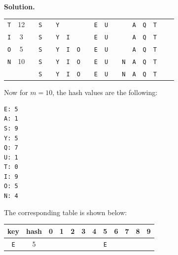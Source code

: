 \documentclass[12pt, a4paper]{article}
\newenvironment{sol}[1][Solution]
{\par\medskip\noindent \textbf{#1.} }
{\medskip}
\begin{document}
\begin{sol}
\begin{center}
\begin{tabular}{cc|cccccccccccccccc}
				\texttt{T} & 12 &
				{} & {\color{gray}\texttt{S}} & {} & {\color{gray}\texttt{Y}} & {} & {} & {} & {\color{gray}\texttt{E}} & {\color{gray}\texttt{U}} & {} & {} & {\color{gray}\texttt{A}} & {\color{black}\texttt{Q}} & {\color{red}\texttt{T}} & {} & {}\\
				
				\texttt{I} & 3 &
				{} & {\color{gray}\texttt{S}} & {} & {\color{black}\texttt{Y}} & {\color{red}\texttt{I}} & {} & {} & {\color{gray}\texttt{E}} & {\color{gray}\texttt{U}} & {} & {} & {\color{gray}\texttt{A}} & {\color{gray}\texttt{Q}} & {\color{gray}\texttt{T}} & {} & {}\\
				
				\texttt{O} & 5 &
				{} & {\color{gray}\texttt{S}} & {} & {\color{gray}\texttt{Y}} & {\color{gray}\texttt{I}} & {\color{red}\texttt{O}} & {} & {\color{gray}\texttt{E}} & {\color{gray}\texttt{U}} & {} & {} & {\color{gray}\texttt{A}} & {\color{gray}\texttt{Q}} & {\color{gray}\texttt{T}} & {} & {}\\
				
				\texttt{N} & 10 &
				{} & {\color{gray}\texttt{S}} & {} & {\color{gray}\texttt{Y}} & {\color{gray}\texttt{I}} & {\color{gray}\texttt{O}} & {} & {\color{gray}\texttt{E}} & {\color{gray}\texttt{U}} & {} & {\color{red}\texttt{N}} & {\color{gray}\texttt{A}} & {\color{gray}\texttt{Q}} & {\color{gray}\texttt{T}} & {} & {}\\
				
				{} & {} &
				{} & {\color{black}\texttt{S}} & {} & {\color{black}\texttt{Y}} & {\color{black}\texttt{I}} & {\color{black}\texttt{O}} & {} & {\color{black}\texttt{E}} & {\color{black}\texttt{U}} & {} & {\color{black}\texttt{N}} & {\color{black}\texttt{A}} & {\color{black}\texttt{Q}} & {\color{black}\texttt{T}} & {} & {}\\
			\end{tabular}
		\end{center}
		Now for $m=10$, the hash values are the following:
		\begin{lstlisting}[language={}]
E: 5
A: 1
S: 9
Y: 5
Q: 7
U: 1
T: 0
I: 9
O: 5
N: 4
		\end{lstlisting}
		The corresponding table is shown below:
		\begin{center}
			\begin{tabular}{cc|cccccccccc}
				{\color{red} key} & {\color{red} hash} &
				0 & 1 & 2 & 3 & 4 & 5 & 6 & 7 & 8 & 9 \\
				\hline
				
				\texttt{E} & 5 &
				{} & {} & {} & {} & {} & {\color{red}\texttt{E}} & {} & {} & {} & {} \\
				

\end{tabular}
\end{center}
\end{sol}
\end{document}

